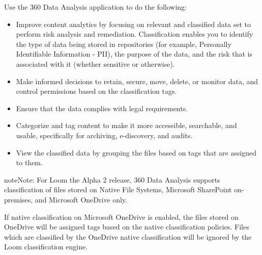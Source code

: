 \documentclass[letterpaper,10pt,english]{sphinxmanual}
\begin{document}
Use the 360 Data Analysis application to do the following:
\begin{itemize}
\item {} 
Improve content analytics by focusing on relevant and classified data set to perform risk analysis and remediation.
Classification enables you to identify the type of data being stored in repositories (for example, Personally Identifiable Information - PII), the purpose of the data, and the risk that is associated with it (whether sensitive or otherwise).

\item {} 
Make informed decisions to retain, secure, move, delete, or monitor data, and control permissions based on the classification tags.

\item {} 
Ensure that the data complies with legal requirements.

\item {} 
Categorize and tag content to make it more accessible, searchable, and usable, specifically for archiving, e-discovery, and audits.

\item {} 
View the classified data by grouping the files based on tags that are assigned to them.

\end{itemize}

\begin{sphinxadmonition}{note}{Note:}
For Loom the Alpha 2 release, 360 Data Analysis supports classification of files stored on Native File Systems, Microsoft SharePoint on-premises, and Microsoft OneDrive only.
\end{sphinxadmonition}

If native classification on Microsoft OneDrive is enabled, the files stored on OneDrive will be assigned tags based on the native classification policies. Files which are classified by the OneDrive native classification will be ignored by the Loom classification engine.
\end{document}
